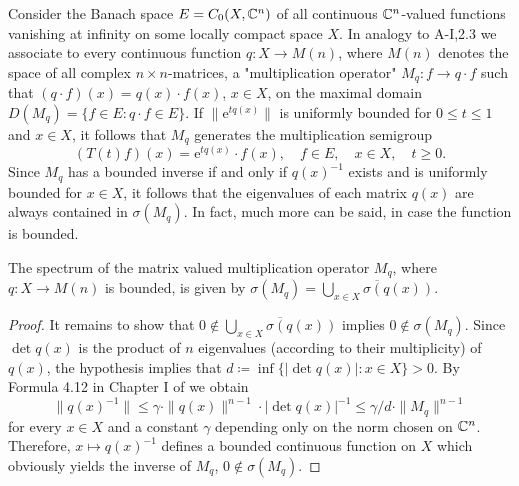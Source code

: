 Consider the Banach space $E = C_{0}(X,\mathbb{C}^{n})$ of all continuous $\mathbb{C}^{n}$-valued functions vanishing at infinity on some locally compact space $X$.
In analogy to A-I,2.3 we associate to every continuous function $q \colon X \to M(n)$, where $M(n)$ denotes the space of all complex $n\times n$-matrices, a "multiplication operator" $M_{q} \colon f \to q\cdot f$ such that $(q\cdot f)(x) = q(x)\cdot f(x)$, $x \in X$, on the maximal domain $D(M_{q}) = \{f \in E \colon q\cdot f \in E\}$.
If $\|\mathrm{e}^{tq(x)}\|$ is uniformly bounded for $0 \leq t \leq 1$ and $x \in X$, it follows that $M_{q}$ generates the multiplication semigroup
\[
	(T(t)f)(x) = \mathrm{e}^{tq(x)}\cdot f(x), \quad f \in E, \quad x \in X, \quad t \geq 0 .
\]
Since $M_{q}$ has a bounded inverse if and only if $q(x)^{-1}$ exists and is uniformly bounded for $x \in X$, it follows that the eigenvalues of each matrix $q(x)$ are always contained in $\sigma(M_{q})$.
In fact, much more can be said, in case the function is bounded.
\begin{lemma}\label{lem:a3-7.1}
The spectrum of the matrix valued multiplication operator $M_{q}$, where $q \colon X \to M(n)$ is bounded, is given by $\sigma(M_{q}) = \overline{\bigcup_{x\in X} \sigma(q(x))}$.
\end{lemma}
\begin{proof}
It remains to show that $0 \notin \overline{\bigcup_{x\in X} \sigma(q(x))}$ implies $0 \notin \sigma(M_{q})$.
Since $\det q(x)$ is the product of $n$ eigenvalues (according to their multiplicity) of $q(x)$, the hypothesis implies that $d \coloneqq \inf\{|\det q(x)| \colon x \in X\} > 0$.
By Formula 4.12 in Chapter I of \citet{kato:1966} we obtain
\[
\|q(x)^{-1}\| \leq \gamma \cdot \|q(x)\|^{n-1} \cdot |\det q(x)|^{-1} \leq \gamma/d \cdot \|M_{q}\|^{n-1}
\]
for every $x \in X$ and a constant $\gamma$ depending only on the norm chosen on $\mathbb{C}^{n}$.
Therefore, $x \mapsto q(x)^{-1}$ defines a bounded continuous function on $X$ which obviously yields the inverse of $M_{q}$, \ie $0 \notin \sigma(M_{q})$.
\end{proof}


